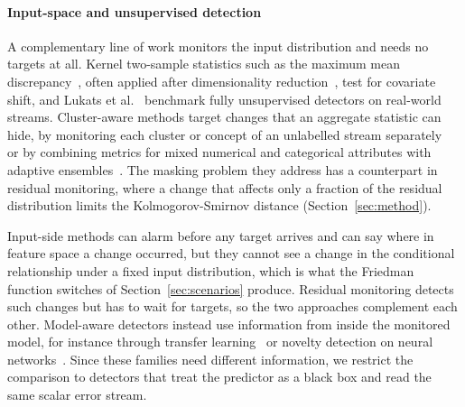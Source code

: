 \documentclass[preprint,12pt]{elsarticle}
\begin{document}
\paragraph{Input-space and unsupervised detection} A complementary line of work monitors the input distribution and needs no targets at all. Kernel two-sample statistics such as the maximum mean discrepancy~\cite{gretton2012kernel}, often applied after dimensionality reduction~\cite{rabanser2019failing}, test for covariate shift, and Lukats et al.~\cite{lukats2025benchmark} benchmark fully unsupervised detectors on real-world streams. Cluster-aware methods target changes that an aggregate statistic can hide, by monitoring each cluster or concept of an unlabelled stream separately~\cite{zhao2024imbalancedcluster,zhang2026unbiasedcluster} or by combining metrics for mixed numerical and categorical attributes with adaptive ensembles~\cite{zhao2022heterogeneous}. The masking problem they address has a counterpart in residual monitoring, where a change that affects only a fraction of the residual distribution limits the Kolmogorov-Smirnov distance (Section~\ref{sec:method}).

Input-side methods can alarm before any target arrives and can say where in feature space a change occurred, but they cannot see a change in the conditional relationship under a fixed input distribution, which is what the Friedman function switches of Section~\ref{sec:scenarios} produce. Residual monitoring detects such changes but has to wait for targets, so the two approaches complement each other. Model-aware detectors instead use information from inside the monitored model, for instance through transfer learning~\cite{wang2023model} or novelty detection on neural networks~\cite{shang2025novelty}. Since these families need different information, we restrict the comparison to detectors that treat the predictor as a black box and read the same scalar error stream.
\end{document}
